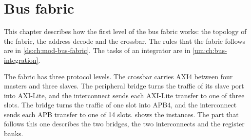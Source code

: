\chapter{Bus fabric}\label{tm:ch:mod-bus-fabric}

This chapter describes how the first level of the bus fabric works: the topology of the fabric, the address decode and the crossbar. The rules that the fabric follows are in \cref{ds:ch:mod-bus-fabric}. The tasks of an integrator are in \cref{um:ch:bus-integration}.

The fabric has three protocol levels. The crossbar  carries AXI4 between four masters and three slaves. The peripheral bridge  turns the traffic of its slave port into AXI-Lite, and the interconnect  sends each AXI-Lite transfer to one of three slots. The bridge  turns the traffic of one slot into APB4, and the interconnect  sends each APB transfer to one of 14 slots.  shows the instances. The part that follows this one describes the two bridges, the two interconnects and the register banks.

